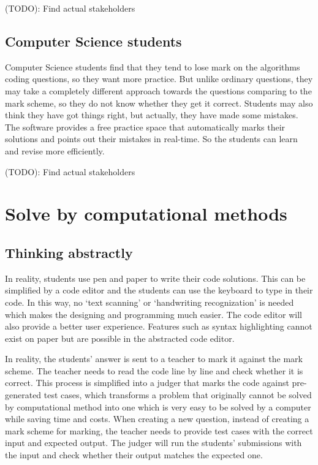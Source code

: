 \documentclass[a4paper]{report}
\begin{document}
(TODO): Find actual stakeholders

\subsection{Computer Science students}

Computer Science students find that they tend to lose mark on the algorithms coding questions, so they want more practice. But unlike ordinary questions, they may take a completely different approach towards the questions comparing to the mark scheme, so they do not know whether they get it correct. Students may also think they have got things right, but actually, they have made some mistakes. The software provides a free practice space that automatically marks their solutions and points out their mistakes in real-time. So the students can learn and revise more efficiently.

(TODO): Find actual stakeholders

\section{Solve by computational methods}

\subsection{Thinking abstractly}

In reality, students use pen and paper to write their code solutions. This can be simplified by a code editor and the students can use the keyboard to type in their code. In this way, no `text scanning' or `handwriting recognization' is needed which makes the designing and programming much easier. The code editor will also provide a better user experience. Features such as syntax highlighting cannot exist on paper but are possible in the abstracted code editor.

In reality, the students' answer is sent to a teacher to mark it against the mark scheme. The teacher needs to read the code line by line and check whether it is correct. This process is simplified into a judger that marks the code against pre-generated test cases, which transforms a problem that originally cannot be solved by computational method into one which is very easy to be solved by a computer while saving time and costs. When creating a new question, instead of creating a mark scheme for marking, the teacher needs to provide test cases with the correct input and expected output. The judger will run the students' submissions with the input and check whether their output matches the expected one.
\end{document}
